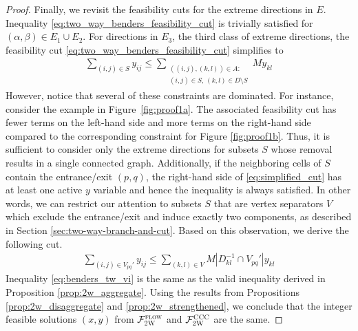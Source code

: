 \documentclass[10pt]{article}
\newcommand{\drivevar}[2]{y_{#1#2}}
\newcommand{\gridinvadjset}[2]{D^{-1}_{#1#2}}
\newcommand{\gridarcset}{A}
\newcommand{\entrancex}{p}
\newcommand{\entrancey}{q}
\newcommand{\vertexcutset}{V}
\newcommand{\twowaypartitioncomp}[1]{V_{#1}'}
\theoremstyle{definition}
\begin{document}
\begin{proof}
Finally, we revisit the feasibility cuts for the extreme directions in $E$. Inequality \eqref{eq:two_way_benders_feasibility_cut} is trivially satisfied for $(\alpha, \beta) \in E_1 \cup E_2$. For directions in $E_3$, the third class of extreme directions, the feasibility cut \eqref{eq:two_way_benders_feasibility_cut} simplifies to 
\begin{align}
\sum_{(i,j) \in S} \drivevar{i}{j} \leq  \sum_{\substack{
  ((i,j),(k,l)) \in \gridarcset:\\
  (i,j) \in S,\,
  (k,l) \in D \setminus S
}} M \drivevar{k}{l}  \label{eq:simplified_cut}
\end{align}
However, notice that several of these constraints are dominated. For instance, consider the example in Figure~\ref{fig:proof1a}. The associated feasibility cut has fewer terms on the left-hand side and more terms on the right-hand side compared to the corresponding constraint for Figure \ref{fig:proof1b}. Thus, it is sufficient to consider only the extreme directions for subsets $S$ whose removal results in a single connected graph. Additionally, if the neighboring cells of $S$ contain the entrance/exit $(p, q)$, the right-hand side of \eqref{eq:simplified_cut} has at least one active $y$ variable and hence the inequality is always satisfied. In other words, we can restrict our attention to subsets $S$ that are vertex separators $V$ which exclude the entrance/exit and induce exactly two components, as described in Section \ref{sec:two-way-branch-and-cut}. Based on this observation, we derive the following cut.
\begin{align}
 \sum_{(i,j) \in \twowaypartitioncomp{\entrancex \entrancey}} \drivevar{i}{j} \leq \sum_{(k,l) \in \vertexcutset} M |\gridinvadjset{k}{l} \cap \twowaypartitioncomp{\entrancex \entrancey}| \drivevar{k}{l} \label{eq:benders_tw_vi}
\end{align}
Inequality \eqref{eq:benders_tw_vi} is the same as the valid inequality derived in Proposition \ref{prop:2w_aggregate}. Using the results from Propositions \ref{prop:2w_disaggregate} and \ref{prop:2w_strengthened}, we conclude that the integer feasible solutions $(x, y)$ from $\mathcal{F}_{\textsc{2W}}^{\textsc{flow}}$ and $\mathcal{F}_{\textsc{2W}}^{\textsc{CCC}}$ are the same.
\end{proof}
\end{document}
